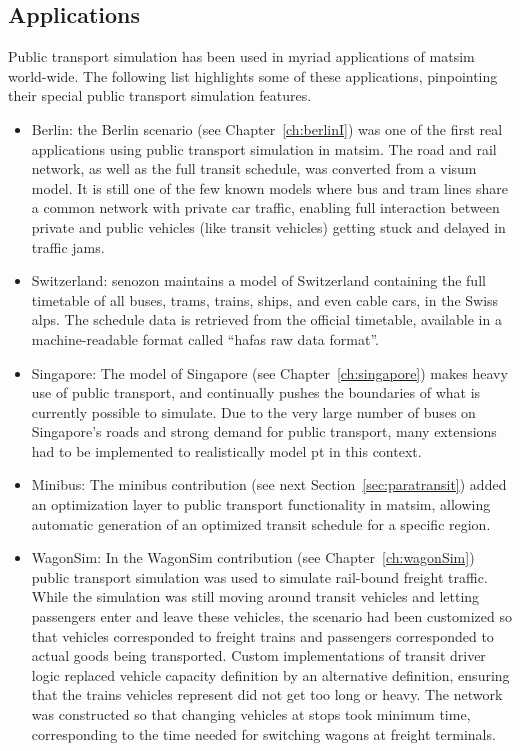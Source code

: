 \subsection{Applications}
Public transport simulation has been used in myriad applications of
\gls{matsim} world-wide. The following list highlights some of these applications,
pinpointing their special public transport simulation features.

\begin{itemize}\styleItemize
	\item Berlin: the Berlin scenario (see Chapter~\ref{ch:berlinI}) was one of
	the first real applications using public transport simulation in \gls{matsim}.
	The road and rail network, as well as the full transit schedule, was converted
	from a \gls{visum} model. It is still one of the few known models where bus and tram
	lines share a common network with private car traffic, enabling full
	interaction between private and public vehicles (like transit vehicles) getting
	stuck and delayed in traffic jams.
	\item Switzerland: \gls{senozon} maintains a model of Switzerland containing the
	full timetable of all buses, trams, trains, ships, and even cable cars, in the
	Swiss alps. The schedule data is retrieved from the official timetable,
	available in a machine-readable format called ``\gls{hafas} raw data format''.
	\item Singapore: The model of Singapore (see Chapter~\ref{ch:singapore}) makes
	heavy use of public transport, and continually pushes the boundaries of what is
	currently possible to simulate. Due to the very large number of buses on
	Singapore's roads and strong demand for public transport, many extensions had to
	be implemented to realistically model pt in this context.
	\item Minibus: The minibus contribution (see next Section~\ref{sec:paratransit}) 
	added an optimization layer to public
	transport functionality in \gls{matsim}, allowing automatic
	generation of an optimized transit schedule for a specific region.
	\item WagonSim: In the WagonSim contribution (see Chapter~\ref{ch:wagonSim})
	public transport simulation was used to simulate
	rail-bound freight traffic. While the simulation was still moving around
	transit vehicles and letting passengers enter and leave these vehicles, the scenario
	had been customized so that vehicles corresponded to freight trains and
	passengers corresponded to actual goods being transported. Custom
	implementations of transit driver logic replaced vehicle capacity definition 
	by an alternative definition, ensuring that the trains vehicles represent
	did not get too long or heavy. The network was constructed so that changing
	vehicles at stops took minimum time, corresponding to the time
	needed for switching wagons at freight terminals.
\end{itemize}

